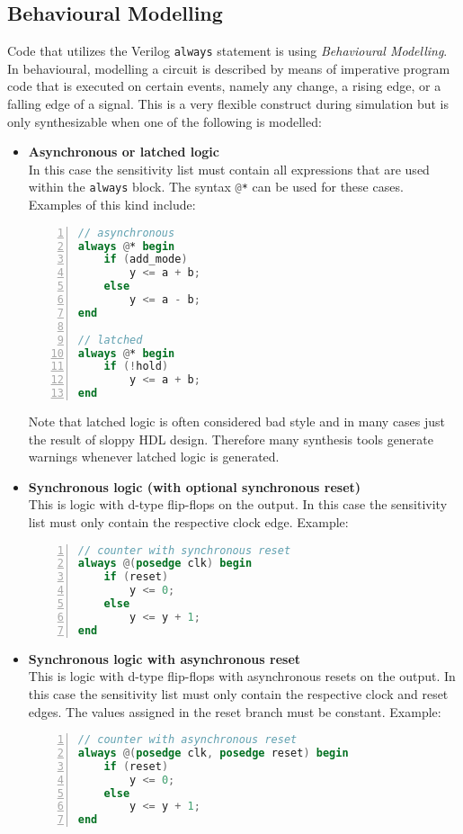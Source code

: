 \subsection{Behavioural Modelling}

Code that utilizes the Verilog {\tt always} statement is using {\it Behavioural
Modelling}. In behavioural, modelling a circuit is described by means of imperative
program code that is executed on certain events, namely any change, a rising
edge, or a falling edge of a signal. This is a very flexible construct during
simulation but is only synthesizable when one of the following is modelled:

\begin{itemize}
\item {\bf Asynchronous or latched logic} \\
In this case the sensitivity list must contain all expressions that are used within
the {\tt always} block. The syntax \lstinline[language=Verilog]{@*} can be used
for these cases. Examples of this kind include:

\begin{lstlisting}[numbers=left,frame=single,language=Verilog]
// asynchronous
always @* begin
	if (add_mode)
		y <= a + b;
	else
		y <= a - b;
end

// latched
always @* begin
	if (!hold)
		y <= a + b;
end
\end{lstlisting}

Note that latched logic is often considered bad style and in many cases just
the result of sloppy HDL design. Therefore many synthesis tools generate warnings
whenever latched logic is generated.

\item {\bf Synchronous logic (with optional synchronous reset)} \\
This is logic with d-type flip-flops on the output. In this case the sensitivity
list must only contain the respective clock edge. Example:
\begin{lstlisting}[numbers=left,frame=single,language=Verilog]
// counter with synchronous reset
always @(posedge clk) begin
	if (reset)
		y <= 0;
	else
		y <= y + 1;
end
\end{lstlisting}

\item {\bf Synchronous logic with asynchronous reset} \\
This is logic with d-type flip-flops with asynchronous resets on the output. In
this case the sensitivity list must only contain the respective clock and reset edges.
The values assigned in the reset branch must be constant. Example:
\begin{lstlisting}[numbers=left,frame=single,language=Verilog]
// counter with asynchronous reset
always @(posedge clk, posedge reset) begin
	if (reset)
		y <= 0;
	else
		y <= y + 1;
end
\end{lstlisting}
\end{itemize}

